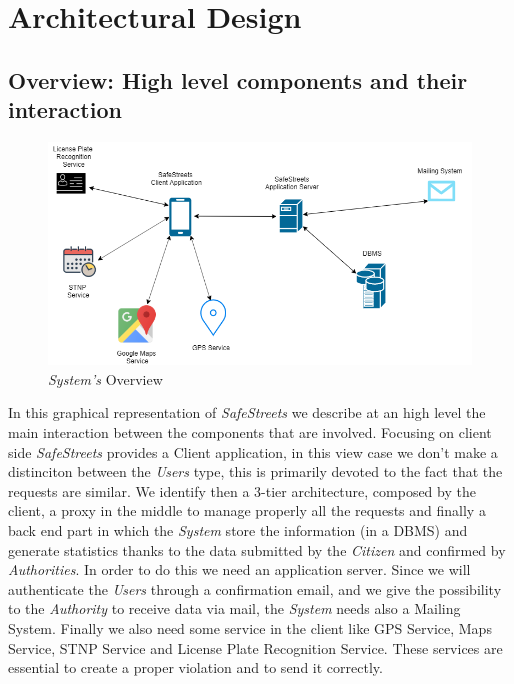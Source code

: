 \documentclass{article}
\begin{document}

\clearpage

\section{Architectural Design}

\subsection{Overview: High level components and their interaction}

\begin{figure}[H]
    \centering
    \includegraphics[scale=0.3]{img/overview.png}
    \caption{\textit{System's} Overview}
\end{figure}

In this graphical representation of \textit{SafeStreets} we describe at an high level the main interaction
between the components that are involved. Focusing on client side \textit{SafeStreets} provides a Client 
application, in this view case we don't make a distinciton between the \textit{Users} type, this is 
primarily devoted to the fact that the requests are similar. We identify then a 3-tier architecture, 
composed by the client, a proxy in the middle to manage properly all the requests and finally a back 
end part in which the \textit{System} store the information (in a DBMS) and generate statistics thanks
to the data submitted by the \textit{Citizen} and confirmed by \textit{Authorities}. In order to do this
we need an application server. Since we will authenticate the \textit{Users} through a confirmation email, 
and we give the possibility to the \textit{Authority} to receive data via mail, the \textit{System} needs
also a Mailing System. Finally we also need some service in the client like GPS Service, Maps Service,
STNP Service and License Plate Recognition Service. These services are essential to create a proper violation
and to send it correctly.
\end{document}
